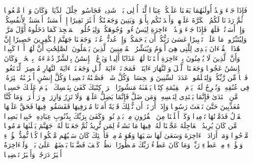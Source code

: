 \stopbuffer
\startbuffer[\q:17:5]
فَإِذَا جَاۤءَ وَعۡدُ أُولَىٰهُمَا بَعَثۡنَا عَلَیۡكُمۡ عِبَادࣰا لَّنَاۤ أُو۟لِی بَأۡسࣲ شَدِیدࣲ فَجَاسُوا۟ خِلَٰلَ ٱلدِّیَارِۚ وَكَانَ وَعۡدࣰا مَّفۡعُولࣰا%
\stopbuffer
\startbuffer[\q:17:6]
ثُمَّ رَدَدۡنَا لَكُمُ ٱلۡكَرَّةَ عَلَیۡهِمۡ وَأَمۡدَدۡنَٰكُم بِأَمۡوَٰلࣲ وَبَنِینَ وَجَعَلۡنَٰكُمۡ أَكۡثَرَ نَفِیرًا%
\stopbuffer
\startbuffer[\q:17:7]
إِنۡ أَحۡسَنتُمۡ أَحۡسَنتُمۡ لِأَنفُسِكُمۡۖ وَإِنۡ أَسَأۡتُمۡ فَلَهَاۚ فَإِذَا جَاۤءَ وَعۡدُ ٱلۡءَاخِرَةِ لِیَسُۥۤءُوا۟ وُجُوهَكُمۡ وَلِیَدۡخُلُوا۟ ٱلۡمَسۡجِدَ كَمَا دَخَلُوهُ أَوَّلَ مَرَّةࣲ وَلِیُتَبِّرُوا۟ مَا عَلَوۡا۟ تَتۡبِیرًا%
\stopbuffer
\startbuffer[\q:17:8]
عَسَىٰ رَبُّكُمۡ أَن یَرۡحَمَكُمۡۚ وَإِنۡ عُدتُّمۡ عُدۡنَاۚ وَجَعَلۡنَا جَهَنَّمَ لِلۡكَٰفِرِینَ حَصِیرًا%
\stopbuffer
\startbuffer[\q:17:9]
إِنَّ هَٰذَا ٱلۡقُرۡءَانَ یَهۡدِی لِلَّتِی هِیَ أَقۡوَمُ وَیُبَشِّرُ ٱلۡمُؤۡمِنِینَ ٱلَّذِینَ یَعۡمَلُونَ ٱلصَّٰلِحَٰتِ أَنَّ لَهُمۡ أَجۡرࣰا كَبِیرࣰا%
\stopbuffer
\startbuffer[\q:17:10]
وَأَنَّ ٱلَّذِینَ لَا یُؤۡمِنُونَ بِٱلۡءَاخِرَةِ أَعۡتَدۡنَا لَهُمۡ عَذَابًا أَلِیمࣰا%
\stopbuffer
\startbuffer[\q:17:11]
وَیَدۡعُ ٱلۡإِنسَٰنُ بِٱلشَّرِّ دُعَاۤءَهُۥ بِٱلۡخَیۡرِۖ وَكَانَ ٱلۡإِنسَٰنُ عَجُولࣰا%
\stopbuffer
\startbuffer[\q:17:12]
وَجَعَلۡنَا ٱلَّیۡلَ وَٱلنَّهَارَ ءَایَتَیۡنِۖ فَمَحَوۡنَاۤ ءَایَةَ ٱلَّیۡلِ وَجَعَلۡنَاۤ ءَایَةَ ٱلنَّهَارِ مُبۡصِرَةࣰ لِّتَبۡتَغُوا۟ فَضۡلࣰا مِّن رَّبِّكُمۡ وَلِتَعۡلَمُوا۟ عَدَدَ ٱلسِّنِینَ وَٱلۡحِسَابَۚ وَكُلَّ شَیۡءࣲ فَصَّلۡنَٰهُ تَفۡصِیلࣰا%
\stopbuffer
\startbuffer[\q:17:13]
وَكُلَّ إِنسَٰنٍ أَلۡزَمۡنَٰهُ طَٰۤئِرَهُۥ فِی عُنُقِهِۦۖ وَنُخۡرِجُ لَهُۥ یَوۡمَ ٱلۡقِیَٰمَةِ كِتَٰبࣰا یَلۡقَىٰهُ مَنشُورًا%
\stopbuffer
\startbuffer[\q:17:14]
ٱقۡرَأۡ كِتَٰبَكَ كَفَىٰ بِنَفۡسِكَ ٱلۡیَوۡمَ عَلَیۡكَ حَسِیبࣰا%
\stopbuffer
\startbuffer[\q:17:15]
مَّنِ ٱهۡتَدَىٰ فَإِنَّمَا یَهۡتَدِی لِنَفۡسِهِۦۖ وَمَن ضَلَّ فَإِنَّمَا یَضِلُّ عَلَیۡهَاۚ وَلَا تَزِرُ وَازِرَةࣱ وِزۡرَ أُخۡرَىٰۗ وَمَا كُنَّا مُعَذِّبِینَ حَتَّىٰ نَبۡعَثَ رَسُولࣰا%
\stopbuffer
\startbuffer[\q:17:16]
وَإِذَاۤ أَرَدۡنَاۤ أَن نُّهۡلِكَ قَرۡیَةً أَمَرۡنَا مُتۡرَفِیهَا فَفَسَقُوا۟ فِیهَا فَحَقَّ عَلَیۡهَا ٱلۡقَوۡلُ فَدَمَّرۡنَٰهَا تَدۡمِیرࣰا%
\stopbuffer
\startbuffer[\q:17:17]
وَكَمۡ أَهۡلَكۡنَا مِنَ ٱلۡقُرُونِ مِنۢ بَعۡدِ نُوحࣲۗ وَكَفَىٰ بِرَبِّكَ بِذُنُوبِ عِبَادِهِۦ خَبِیرَۢا بَصِیرࣰا%
\stopbuffer
\startbuffer[\q:17:18]
مَّن كَانَ یُرِیدُ ٱلۡعَاجِلَةَ عَجَّلۡنَا لَهُۥ فِیهَا مَا نَشَاۤءُ لِمَن نُّرِیدُ ثُمَّ جَعَلۡنَا لَهُۥ جَهَنَّمَ یَصۡلَىٰهَا مَذۡمُومࣰا مَّدۡحُورࣰا%
\stopbuffer
\startbuffer[\q:17:19]
وَمَنۡ أَرَادَ ٱلۡءَاخِرَةَ وَسَعَىٰ لَهَا سَعۡیَهَا وَهُوَ مُؤۡمِنࣱ فَأُو۟لَٰۤئِكَ كَانَ سَعۡیُهُم مَّشۡكُورࣰا%
\stopbuffer
\startbuffer[\q:17:20]
كُلࣰّا نُّمِدُّ هَٰۤؤُلَاۤءِ وَهَٰۤؤُلَاۤءِ مِنۡ عَطَاۤءِ رَبِّكَۚ وَمَا كَانَ عَطَاۤءُ رَبِّكَ مَحۡظُورًا%
\stopbuffer
\startbuffer[\q:17:21]
ٱنظُرۡ كَیۡفَ فَضَّلۡنَا بَعۡضَهُمۡ عَلَىٰ بَعۡضࣲۚ وَلَلۡءَاخِرَةُ أَكۡبَرُ دَرَجَٰتࣲ وَأَكۡبَرُ تَفۡضِیلࣰا%
\stopbuffer

